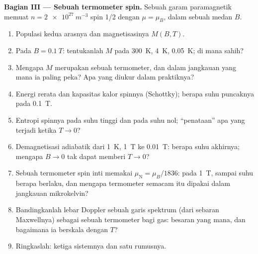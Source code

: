 \begin{problem}
\textbf{Bagian III --- Sebuah termometer spin.}
Sebuah garam paramagnetik memuat $n = \qty{2e27}{m^{-3}}$ spin 1/2 dengan $\mu
= \mu_B$, dalam sebuah medan $B$.
\begin{enumerate}[resume]
  \item Populasi kedua arasnya dan magnetisasinya
        $M(B,T)$.
  \item Pada $B = \qty{0.1}{T}$: tentukanlah $M$ pada \qty{300}{K}, \qty{4}{K}, \qty{0.05}{K};
        di mana  sahih?
  \item Mengapa $M$ merupakan sebuah termometer, dan dalam jangkauan yang mana ia paling
        peka? Apa yang diukur dalam praktiknya?
  \item Energi rerata dan kapasitas kalor spinnya (Schottky);
        berapa suhu puncaknya pada \qty{0.1}{T}.
  \item Entropi spinnya pada suhu tinggi dan pada suhu nol; ``penataan''
        apa yang terjadi ketika $T \to 0$?
  \item Demagnetisasi adiabatik dari \qty{1}{K}, \qty{1}{T} ke \qty{0.01}{T}:
        berapa suhu akhirnya; mengapa $B \to 0$ tak dapat memberi $T \to 0$?
  \item Sebuah termometer spin inti memakai $\mu_{\text{N}} = \mu_B/1836$: pada
        \qty{1}{T}, sampai suhu berapa  berlaku, dan
        mengapa termometer semacam itu dipakai dalam jangkauan mikrokelvin?
  \item Bandingkanlah lebar Doppler sebuah garis spektrum (dari sebaran
        Maxwellnya) sebagai sebuah termometer bagi gas: besaran yang mana, dan
        bagaimana ia berskala dengan $T$?
  \item Ringkaslah: ketiga sistemnya dan satu rumusnya.
\end{enumerate}
\end{problem}
